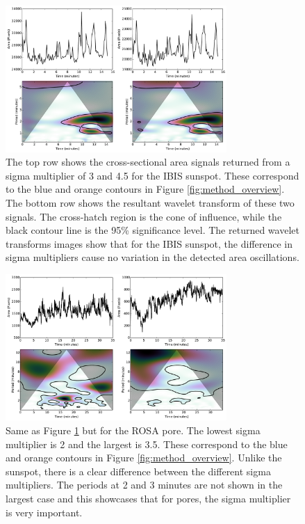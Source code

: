     \begin{figure}
        \centering
        \includegraphics[width=0.75\textwidth]{sunspot_wavelet.pdf}
        \caption{
	             The top row shows the cross-sectional area signals returned from a sigma multiplier of 3 and 4.5 for the IBIS sunspot.
	             These correspond to the blue and orange contours in Figure \ref{fig:method_overview}.
	             The bottom row shows the resultant wavelet transform of these two signals.
	             The cross-hatch region is the cone of influence, while the black contour line is the 95\% significance level.
	             The returned wavelet transforms images show that for the IBIS sunspot, the difference in sigma multipliers cause no variation in the detected area oscillations.
                }
        \label{fig:sunspot_wavelet}
    \end{figure}
    
    \begin{figure}
        \centering
        \includegraphics[width=0.75\textwidth]{pore_wavelet.pdf}
        \caption{
		         Same as Figure \ref{fig:sunspot_wavelet} but for the ROSA pore.
		         The lowest sigma multiplier is 2 and the largest is 3.5. 
		         These correspond to the blue and orange contours in Figure \ref{fig:method_overview}.
		         Unlike the sunspot, there is a clear difference between the different sigma multipliers.
		         The periods at 2 and 3 minutes are not shown in the largest case and this showcases that for pores, the sigma multiplier is very important. 
                }
        \label{fig:pore_wavelet}
    \end{figure}
    
